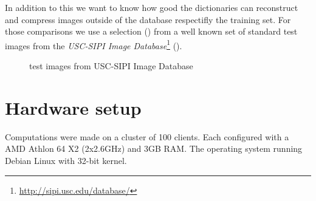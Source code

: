 In addition to this we want to know how good the dictionaries can reconstruct
and compress images outside of the database respectifly the training set. For
those comparisons we use a selection () from a
well known set of standard test images from the \emph{USC-SIPI Image
Database}\footnote{\url{http://sipi.usc.edu/database/}}
(). 
\begin{figure}[H]
\centering
\hspace{5mm}
\hspace{5mm}
\caption{test images from USC-SIPI Image Database}
\label{fig:USC-SIPI}
\end{figure}


\section{Hardware setup} 
Computations were made on a cluster of 100 clients. Each 
configured with a AMD Athlon 64 X2 (2x2.6GHz) and 3GB RAM.
The operating system running Debian Linux with 32-bit kernel. 

